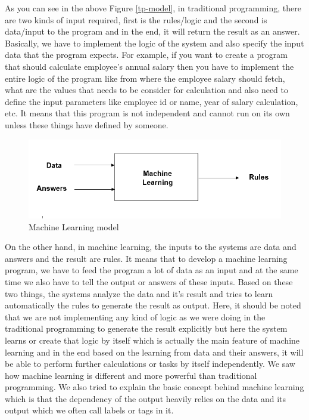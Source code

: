 \par
As you can see in the above Figure \ref{tp-model}, in traditional programming, there are two kinds of input required, first is the rules/logic and the second is data/input to the program and in the end, it will return the result as an answer. Basically, we have to implement the logic of the system and also specify the input data that the program expects. For example, if you want to create a program that should calculate employee's annual salary then you have to implement the entire logic of the program like from where the employee salary should fetch, what are the values that needs to be consider for calculation and also need to define the input parameters like employee id or name, year of salary calculation, etc. It means that this program is not independent and cannot run on its own unless these things have defined by someone.
\begin{figure}[H]
\centering
\includegraphics[scale=0.7]{images/Chapter2/ML.PNG}
\caption{Machine Learning model}
\label{mlp-model}
\end{figure}
\par
On the other hand, in machine learning, the inputs to the systems are data and answers and the result are rules. It means that to develop a machine learning program, we have to feed the program a lot of data as an input and at the same time we also have to tell the output or answers of these inputs. Based on these two things, the systems analyze the data and it's result and tries to learn automatically the rules to generate the result as output. Here, it should be noted that we are not implementing any kind of logic as we were doing in the traditional programming to generate the result explicitly but here the system learns or create that logic by itself which is actually the main feature of machine learning and in the end based on the learning from data and their answers, it will be able to perform further calculations or tasks by itself independently. We saw how machine learning is different and more powerful than traditional programming. We also tried to explain the basic concept behind machine learning which is that the dependency of the output heavily relies on the data and its output which we often call labels or tags in it.
